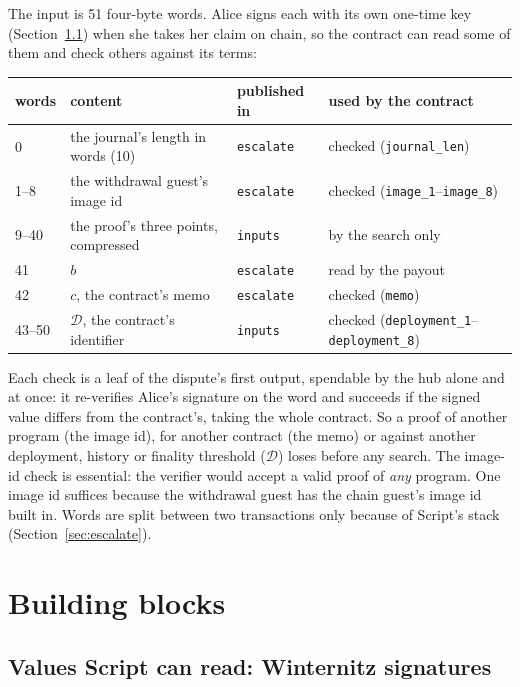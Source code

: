 \documentclass[11pt]{article}
\newcommand{\tx}[1]{\texttt{#1}}
\begin{document}
The input is 51 four-byte words. Alice signs each with its own one-time
key (Section~\ref{sec:wots}) when she takes her claim on chain, so the
contract can read some of them and check others against its terms:
\begin{center}
\small
\begin{tabular}{llll}
\toprule
words & content & published in & used by the contract \\
\midrule
0 & the journal's length in words (10) & \tx{escalate} & checked (\tx{journal\_len}) \\
1--8 & the withdrawal guest's image id & \tx{escalate} & checked (\tx{image\_1}--\tx{image\_8}) \\
9--40 & the proof's three points, compressed & \tx{inputs} & by the search only \\
41 & $b$ & \tx{escalate} & read by the payout \\
42 & $c$, the contract's memo & \tx{escalate} & checked (\tx{memo}) \\
43--50 & $\mathcal{D}$, the contract's identifier & \tx{inputs} & checked (\tx{deployment\_1}--\tx{deployment\_8}) \\
\bottomrule
\end{tabular}
\end{center}
Each check is a leaf of the dispute's first output, spendable by the hub
alone and at once: it re-verifies Alice's signature on the word and
succeeds if the signed value differs from the contract's, taking the
whole contract. So a proof of another program (the image id), for
another contract (the memo) or against another deployment, history or
finality threshold ($\mathcal{D}$) loses before any search. The image-id check is
essential: the verifier would accept a valid proof of \emph{any}
program. One image id suffices because the withdrawal guest has the
chain guest's image id built in. Words are split between two
transactions only because of Script's stack (Section~\ref{sec:escalate}).

\section{Building blocks}
\label{sec:blocks}

\subsection{Values Script can read: Winternitz signatures}
\label{sec:wots}
\end{document}
